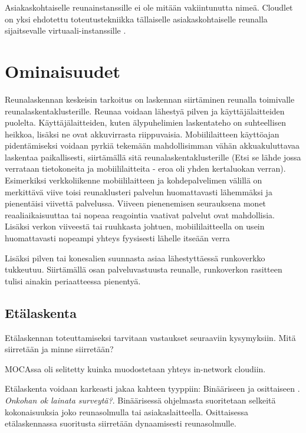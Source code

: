 \documentclass[finnish]{tktltiki2}
\theoremstyle{definition}
\theoremstyle{remark}
\begin{document}
Asiakaskohtaiselle reunainstanssille ei ole mitään vakiintunutta nimeä.
Cloudlet on yksi ehdotettu toteutustekniikka tällaiselle asiakaskohtaiselle reunalla sijaitsevalle virtuaali-instanssille \cite{satya09}.

\section{Ominaisuudet}

Reunalaskennan keskeisin tarkoitus on laskennan siirtäminen reunalla toimivalle reunalaskentaklusterille. Reunaa voidaan lähestyä pilven ja käyttäjälaitteiden puolelta. Käyttäjälaitteiden, kuten älypuhelimien laskentateho on suhteellisen heikkoa, lisäksi ne ovat akkuvirrasta riippuvaisia. 
Mobiililaitteen käyttöajan pidentämiseksi voidaan pyrkiä tekemään mahdollisimman vähän akkuakuluttavaa laskentaa paikallisesti, siirtämällä sitä reunalaskentaklusterille (Etsi se lähde jossa verrataan tietokoneita ja mobiililaitteita - eroa oli yhden kertaluokan verran).
Esimerkiksi verkkoliikenne mobiililaitteen ja kohdepalvelimen välillä on merkittävä viive toisi reunaklusteri palvelun huomattavasti lähemmäksi ja pienentäisi viivettä palvelussa. Viiveen pienenemisen seurauksena monet reaaliaikaisuuttaa tai nopeaa reagointia vaativat palvelut ovat mahdollisia. Lisäksi verkon viiveestä tai ruuhkasta johtuen, mobiililaitteella on usein huomattavasti nopeampi yhteys fyysisesti lähelle itseään verra

Lisäksi pilven tai konesalien suunnasta asiaa lähestyttäessä runkoverkko tukkeutuu. Siirtämällä osan palveluvastuusta reunalle, runkoverkon rasitteen tulisi ainakin periaatteessa pienentyä. 


\subsection{Etälaskenta}
Etälaskennan toteuttamiseksi tarvitaan vastaukset seuraaviin kysymyksiin. Mitä siirretään ja minne siirretään?

MOCAssa oli selitetty kuinka muodostetaan yhteys in-network cloudiin.

Etälaskenta voidaan karkeasti jakaa kahteen tyyppiin: Binääriseen ja osittaiseen \cite{mao17}. \textit{Onkohan ok lainata surveytä?}. Binäärisessä ohjelmasta suoritetaan selkeitä kokonaisuuksia joko reunasolmulla tai asiakaslaitteella. Osittaisessa etälaskennassa suoritusta siirretään dynaamisesti reunasolmulle. 
\end{document}
